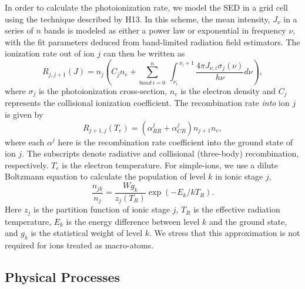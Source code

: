 \documentclass[useAMS,usenatbib]{mn2e_x}
\begin{document}
In order to calculate the photoionization rate, 
we model the SED in a grid cell using the technique described by H13. In this scheme,
the mean intensity, $J_{\nu}$ in a series of $n$ bands is modeled as either a power law or exponential
in frequency $\nu$, with the fit parameters deduced from band-limited radiation field estimators.
The ionization rate out of ion $j$ can then be written as 
\begin{equation}
R_{j,j+1}(J)= 
\displaystyle{
n_j \left(C_{j} n_e + 
\sum_{band~i=0}^{n}~
{\int_{\nu_i}^{~\nu_i+1} \frac{4 \pi J_{\nu,i}\sigma_j(\nu)}  {h \nu} d\nu}
\right),}
\end{equation}
where $\sigma_j$ is the photoionization cross-section, $n_e$
is the electron density and $C_{j}$
represents the collisional ionization coefficient.
The recombination rate {\em into} ion $j$ is given by 
\begin{equation}
R_{j+1,j}(T_e) = (\alpha^j_{RR} + \alpha^j_{CR}) n_{j+1} n_e,
\end{equation}
where each $\alpha^j$ here is the recombination rate coefficient into the ground state of ion $j$.
The subscripts denote radiative and 
collisional (three-body) recombination, respectively. 
$T_e$ is the electron temperature.
For simple-ions, we use a dilute Boltzmann equation to calculate 
the population of level $k$ in ionic stage $j$,
\begin{equation}
\frac{n_{jk}}{n_j} = \frac{W g_k}{z_j(T_R)} \exp(-E_k/kT_R).
\end{equation}
Here $z_j$ is the partition function of ionic stage $j$,
$T_R$ is the effective radiation temperature,
$E_k$ is the energy difference between level $k$ and the ground state,
and $g_k$ is the statistical weight of level $k$. 
We stress that this approximation is not required for ions
treated as macro-atoms.

\subsection{Physical Processes}
\end{document}
